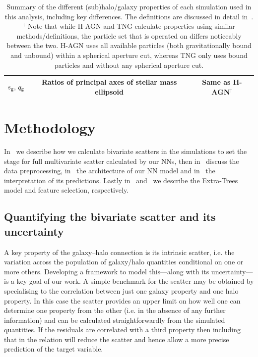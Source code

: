 \documentclass[usenatbib,useAMS]{mnras}
\begin{document}
\begin{table}
\begin{tabular}{ccc}
        $s_{\rm g},\,q_{\rm g}$ & Ratios of principal axes of stellar mass ellipsoid & Same as H-AGN$^\dagger$\\
        \hline
    \end{tabular}
    \caption{Summary of the different (sub)halo/galaxy properties of each simulation used in this analysis, including key differences. The definitions are discussed in detail in~. \\[5pt]
    $^\dagger$ Note that while H-AGN and TNG calculate properties using similar methods/definitions, the particle set that is operated on differs noticeably between the two. H-AGN uses all available particles (both gravitationally bound and unbound) within a spherical aperture cut, whereas TNG only uses bound particles and without any spherical aperture cut.}
    \label{tab:properties}
\end{table}

\section{Methodology}
\label{sec:methodology}

In~ we describe how we calculate bivariate scatters in the simulations to set the stage for full multivariate scatter calculated by our \acp{NN}, then in~ discuss the data preprocessing, in~ the architecture of our \ac{NN} model and in~ the interpretation of its predictions. Lastly in~ and~ we describe the Extra-Trees model and feature selection, respectively.


\subsection{Quantifying the bivariate scatter and its uncertainty}
\label{sec:sim_scatter}


A key property of the galaxy--halo connection is its intrinsic scatter, i.e. the variation across the population of galaxy/halo quantities conditional on one or more others. Developing a framework to model this---along with its uncertainty---is a key goal of our work. A simple benchmark for the scatter may be obtained by specialising to the correlation between just one galaxy property and one halo property. In this case the scatter provides an upper limit on how well one can determine one property from the other (i.e. in the absence of any further information) and can be calculated straightforwardly from the simulated quantities. If the residuals are correlated with a third property then including that in the relation will reduce the scatter and hence allow a more precise prediction of the target variable.
\end{document}
